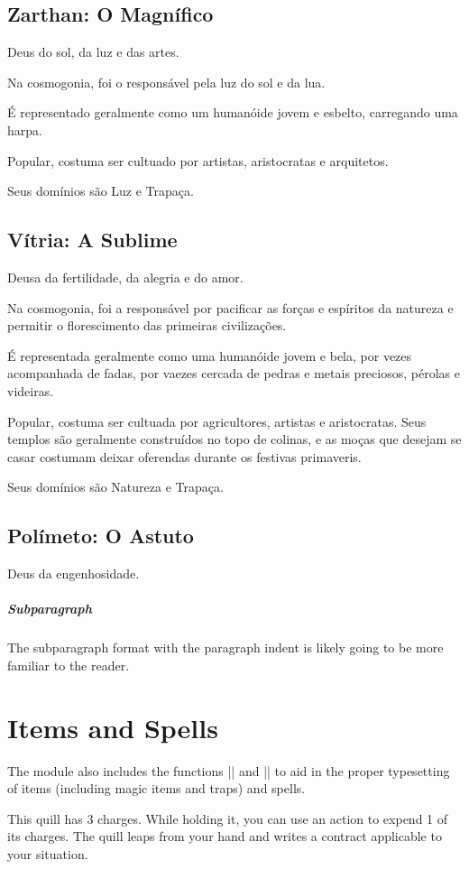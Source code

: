\documentclass[letterpaper,twocolumn,openany]{dndbook}
\begin{document}
	\subsection{Zarthan: O Magnífico}
	Deus do sol, da luz e das artes.
	\par Na cosmogonia, foi o responsável pela luz do sol e da lua.
	\par É representado geralmente como um humanóide jovem e esbelto, carregando uma harpa.
	\par Popular, costuma ser cultuado por artistas, aristocratas e arquitetos.
	\par Seus domínios são Luz e Trapaça.
	
	\subsection{Vítria: A Sublime}
	Deusa da fertilidade, da alegria e do amor.
	\par Na cosmogonia, foi a responsável por pacificar as forças e espíritos da natureza e permitir o florescimento das primeiras civilizações.
	\par É representada geralmente como uma humanóide jovem e bela, por vezes acompanhada de fadas, por vaezes cercada de pedras e metais preciosos, pérolas e videiras.
	\par Popular, costuma ser cultuada por agricultores, artistas e aristocratas. Seus templos são geralmente construídos no topo de colinas, e as moças que desejam se casar costumam deixar oferendas durante os festivas primaveris.
	\par Seus domínios são Natureza e Trapaça.
	
	\subsection{Polímeto: O Astuto}
	Deus da engenhosidade.
	
	\subparagraph{Subparagraph}
	The subparagraph format with the paragraph indent is likely going to be more familiar to the reader.
	
	\section{Items and Spells}
	The module also includes the functions |\subtitlesection| and |\spellheader| to aid in the proper typesetting of items (including magic items and traps) and spells.
	
	This quill has 3 charges. While holding it, you can use an action to expend 1 of its charges. The quill leaps from your hand and writes a contract applicable to your situation.
	
\end{document}
